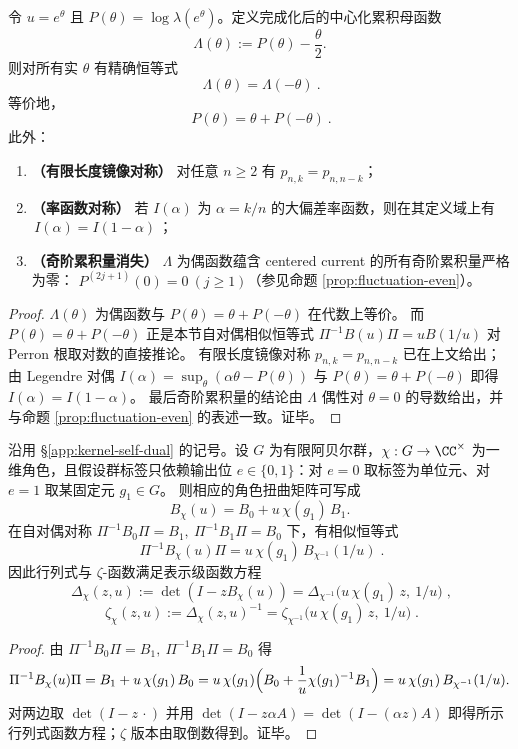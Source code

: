 \begin{theorem}\label{thm:sync-kernel-gallavotti-cohen}
令 \(u=e^{\theta}\) 且 \(P(\theta)=\log\lambda(e^\theta)\)。定义完成化后的中心化累积母函数
\[
\Lambda(\theta):=P(\theta)-\frac{\theta}{2}.
\]
则对所有实 \(\theta\) 有精确恒等式
\[
\boxed{\ \Lambda(\theta)=\Lambda(-\theta)\ }.
\]
等价地，
\[
\boxed{\ P(\theta)=\theta+P(-\theta)\ }.
\]
此外：
\begin{enumerate}
  \item \textbf{（有限长度镜像对称）} 对任意 \(n\ge 2\) 有 \(p_{n,k}=p_{n,n-k}\)；
  \item \textbf{（率函数对称）} 若 \(I(\alpha)\) 为 \(\alpha=k/n\) 的大偏差率函数，则在其定义域上有
  \(\boxed{\,I(\alpha)=I(1-\alpha)\,}\)；
  \item \textbf{（奇阶累积量消失）} \(\Lambda\) 为偶函数蕴含 centered current 的所有奇阶累积量严格为零：
  \(P^{(2j+1)}(0)=0\ (j\ge 1)\)（参见命题 \ref{prop:fluctuation-even}）。
\end{enumerate}
\end{theorem}
\begin{proof}
\(\Lambda(\theta)\) 为偶函数与 \(P(\theta)=\theta+P(-\theta)\) 在代数上等价。
而 \(P(\theta)=\theta+P(-\theta)\) 正是本节自对偶相似恒等式 \(\Pi^{-1}B(u)\Pi=uB(1/u)\) 对 Perron 根取对数的直接推论。
有限长度镜像对称 \(p_{n,k}=p_{n,n-k}\) 已在上文给出；由 Legendre 对偶 \(I(\alpha)=\sup_{\theta}(\alpha\theta-P(\theta))\) 与 \(P(\theta)=\theta+P(-\theta)\) 即得 \(I(\alpha)=I(1-\alpha)\)。
最后奇阶累积量的结论由 \(\Lambda\) 偶性对 \(\theta=0\) 的导数给出，并与命题 \ref{prop:fluctuation-even} 的表述一致。证毕。
\end{proof}

\begin{proposition}\label{prop:kernel-self-dual-character}
沿用 \S\ref{app:kernel-self-dual} 的记号。设 \(G\) 为有限阿贝尔群，\(\chi:G\to\CC^\times\) 为一维角色，且假设群标签只依赖输出位 \(e\in\{0,1\}\)：对 \(e=0\) 取标签为单位元、对 \(e=1\) 取某固定元 \(g_1\in G\)。
则相应的角色扭曲矩阵可写成
\[
B_\chi(u)=B_0+u\,\chi(g_1)\,B_1.
\]
在自对偶对称 \(\Pi^{-1}B_0\Pi=B_1,\ \Pi^{-1}B_1\Pi=B_0\) 下，有相似恒等式
\[
\boxed{\;
\Pi^{-1}B_\chi(u)\Pi
=u\,\chi(g_1)\,B_{\chi^{-1}}(1/u)\; }.
\]
因此行列式与 \(\zeta\)-函数满足表示级函数方程
\[
\boxed{\;
\Delta_\chi(z,u):=\det(I-zB_\chi(u))
=\Delta_{\chi^{-1}}\!\bigl(u\,\chi(g_1)\,z,\ 1/u\bigr)\; },
\]
\[
\boxed{\;
\zeta_\chi(z,u):=\Delta_\chi(z,u)^{-1}
=\zeta_{\chi^{-1}}\!\bigl(u\,\chi(g_1)\,z,\ 1/u\bigr)\; }.
\]
\end{proposition}
\begin{proof}
由 \(\Pi^{-1}B_0\Pi=B_1,\ \Pi^{-1}B_1\Pi=B_0\) 得
\[
\Pi^{-1}B_\chi(u)\Pi
=B_1+u\,\chi(g_1)\,B_0
=u\,\chi(g_1)\Bigl(B_0+\frac{1}{u}\chi(g_1)^{-1}B_1\Bigr)
=u\,\chi(g_1)\,B_{\chi^{-1}}(1/u).
\]
对两边取 \(\det(I-z\,\cdot)\) 并用 \(\det(I-z\alpha A)=\det(I-(\alpha z)A)\) 即得所示行列式函数方程；\(\zeta\) 版本由取倒数得到。证毕。
\end{proof}


